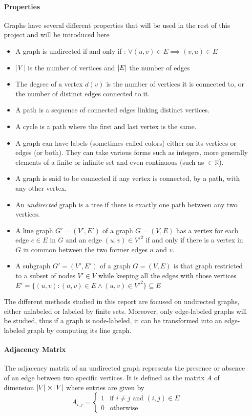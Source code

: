\documentclass{article}
\DeclarePairedDelimiter{\abs}{\lvert}{\rvert}
\newcommand*{\R}{%
  \mathbb{R}%
}
\theoremstyle{definition}
\begin{document}
\paragraph{Properties} Graphs have several different properties that will be used in the rest of this project and will be introduced here
\begin{itemize}
	\item A graph is undirected if and only if : $\forall (u,v) \in E \implies (v,u)\in E$
	\item $\abs{V}$ is the number of vertices and $\abs{E}$ the number of edges
	\item The degree of a vertex $d(v)$ is the number of vertices it is connected to, or the number of distinct edges connected to it.
	\item A path is a sequence of connected edges linking distinct vertices.
	\item A cycle is a path where the first and last vertex is the same.
	\item A graph can have labels (sometimes called colors) either on its vertices or edges (or both). They can take various forms such as integers, more generally elements of a finite or infinite set and even continuous (such as $\in \R$). 
	\item A graph is said to be connected if any vertex is connected, by a path, with any other vertex.
	\item An \emph{undirected} graph is a tree if there is exactly one path between any two vertices.
	\item A line graph $G'=(V',E')$ of a graph $G=(V,E)$ has a vertex for each edge $e\in E$ in $G$ and an edge $(u,v)\in V'^2$ if and only if there is a vertex in $G$ in common between the two former edges $u$ and $v$.
	\item A subgraph $G'=(V',E')$ of a graph $G=(V,E)$ is that graph restricted to a subset of nodes $V' \in V$ while keeping all the edges with those vertices $E' = \{(u,v) : (u,v) \in E \land (u,v) \in V'^{2}\} \subseteq E$
\end{itemize} The different methods studied in this report are focused on undirected graphs, either unlabeled or labeled by finite sets. Moreover, only edge-labeled graphs will be studied, thus if a graph is node-labeled, it can be transformed into an edge-labeled graph by computing its line graph.
\paragraph{Adjacency Matrix} The adjacency matrix of an undirected graph represents the presence or absence of an edge between two specific vertices. It is defined as the matrix $A$ of dimension $\abs{V}\times\abs{V}$ where entries are given by
\begin{equation}
	A_{i,j}=\left\{
	\begin{matrix}
	1 & \mbox{if } i \neq j \mbox{ and } (i,j) \in E \\
	0 & \mbox{otherwise}
	\end{matrix}
	\right.
\end{equation}
\end{document}
